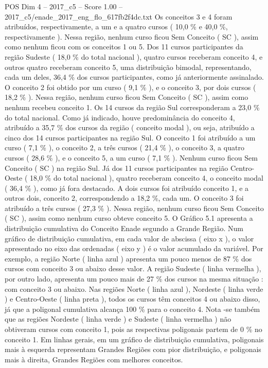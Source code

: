 \begin{textsample}{POS Dim 4 – 2017\_c5 – Score 1.00 – 2017\_c5/enade\_2017\_eng\_flo\_617fb2f4dc.txt}
Os conceitos 3 e 4 foram atribuídos, respectivamente, a um e a quatro cursos ( 10,0 \% e 40,0 \%, respectivamente ).
Nessa região, nenhum curso ficou Sem Conceito ( SC ), assim como nenhum ficou com os conceitos 1 ou 5.
Dos 11 cursos participantes da região Sudeste ( 18,0 \% do total nacional ), quatro cursos receberam conceito 4, e outros quatro receberam conceito 5, uma distribuição bimodal, representando, cada um deles, 36,4 \% dos cursos participantes, como já anteriormente assinalado.
O conceito 2 foi obtido por um curso ( 9,1 \% ), e o conceito 3, por dois cursos ( 18,2 \% ).
Nessa região, nenhum curso ficou Sem Conceito ( SC ), assim como nenhum recebeu conceito 1.
Os 14 cursos da região Sul corresponderam a 23,0 \% do total nacional.
Como já indicado, houve predominância do conceito 4, atribuído a 35,7 \% dos cursos da região ( conceito modal ), ou seja, atribuído a cinco dos 14 cursos participantes na região Sul.
O conceito 1 foi atribuído a um curso ( 7,1 \% ), o conceito 2, a três cursos ( 21,4 \% ), o conceito 3, a quatro cursos ( 28,6 \% ), e o conceito 5, a um curso ( 7,1 \% ).
Nenhum curso ficou Sem Conceito ( SC ) na região Sul.
Já dos 11 cursos participantes na região Centro-Oeste ( 18,0 \% do total nacional ), quatro receberam conceito 4, o conceito modal ( 36,4 \% ), como já fora destacado.
A dois cursos foi atribuído conceito 1, e a outros dois, conceito 2, correspondendo a 18,2 \%, cada um.
O conceito 3 foi atribuído a três cursos ( 27,3 \% ).
Nessa região, nenhum curso ficou Sem Conceito ( SC ), assim como nenhum curso obteve conceito 5.
O Gráfico 5.1 apresenta a distribuição cumulativa do Conceito Enade segundo a Grande Região.
Num gráfico de distribuição cumulativa, em cada valor de abscissa ( eixo x ), o valor apresentado no eixo das ordenadas ( eixo y ) é o valor acumulado da variável.
Por exemplo, a região Norte ( linha azul ) apresenta um pouco menos de 87 \% dos cursos com conceito 3 ou abaixo desse valor.
A região Sudeste ( linha vermelha ), por outro lado, apresenta um pouco mais de 27 \% dos cursos na mesma situação : com conceito 3 ou abaixo.
Nas regiões Norte ( linha azul ), Nordeste ( linha verde ) e Centro-Oeste ( linha preta ), todos os cursos têm conceitos 4 ou abaixo disso, já que a poligonal cumulativa alcança 100 \% para o conceito 4.
Nota -se também que as regiões Nordeste ( linha verde ) e Sudeste ( linha vermelha ) não obtiveram cursos com conceito 1, pois as respectivas poligonais partem de 0 \% no conceito 1.
Em linhas gerais, em um gráfico de distribuição cumulativa, poligonais mais à esquerda representam Grandes Regiões com pior distribuição, e poligonais mais à direita, Grandes Regiões com melhores conceitos.

\end{textsample}
